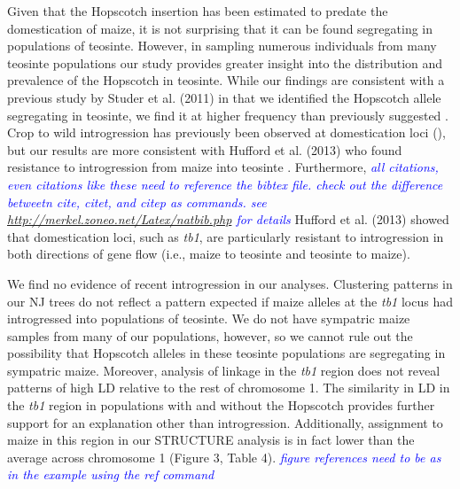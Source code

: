 \documentclass[12pt]{article}
\newcommand{\jri}[1]{\textcolor{blue}{ \emph{\scriptsize  #1}} }
\begin{document}
Given that the Hopscotch insertion has been estimated to predate the domestication of maize, it is not surprising that it can be found segregating in populations of teosinte. However, in sampling numerous individuals from many teosinte populations our study provides greater insight into the distribution and prevalence of the Hopscotch in teosinte. While our findings are consistent with a previous study by Studer et al. (2011) in that we identified the Hopscotch allele segregating in teosinte, we find it at higher frequency than previously suggested \cite{Studer et al 2011}. Crop to wild introgression has previously been observed at domestication loci (\cite{Ellstrand et al 1999, Zhang et al 2009, Thurber et al 2010, Baack et al 2008, Hubner et al 2012, Wilkes et al 1977, Van Heerwaarden et al 2011, Barrett 1983}), but our results are more consistent with Hufford et al. (2013) who found resistance to introgression from maize into teosinte \cite{Hufford et al 2013}. Furthermore, \jri{all citations, even citations like these need to reference the bibtex file. check out the difference betweetn cite, citet, and citep as commands. see \url{http://merkel.zoneo.net/Latex/natbib.php} for details} Hufford et al. (2013) showed that domestication loci, such as \emph{tb1}, are particularly resistant to introgression in both directions of gene flow (i.e., maize to teosinte and teosinte to maize). 

We find no evidence of recent introgression in our analyses. Clustering patterns in our NJ trees do not reflect a pattern expected if maize alleles at the \emph{tb1} locus had introgressed into populations of teosinte. We do not have sympatric maize samples from many of our populations, however, so we cannot rule out the possibility that Hopscotch alleles in these teosinte populations are segregating in sympatric maize. Moreover, analysis of linkage in the \emph{tb1} region does not reveal patterns of high LD relative to the rest of chromosome 1. The similarity in LD in the \emph{tb1} region in populations with and without the Hopscotch provides further support for an explanation other than introgression. Additionally, assignment to maize in this region in our STRUCTURE analysis is in fact lower than the average across chromosome 1 (Figure 3, Table 4). \jri{figure references need to be as in the example using the ref command}
\end{document}
